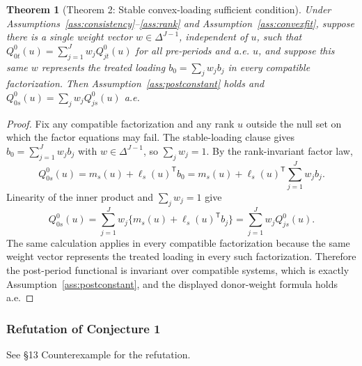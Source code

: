 \documentclass[11pt]{article}
\newcommand{\transpose}{\mathsf{T}}
\theoremstyle{definition}
\theoremstyle{plain}
\newtheorem{theorem}{Theorem}
\theoremstyle{remark}
\begin{document}
\begin{theorem}[Theorem 2: Stable convex-loading sufficient condition]\label{thm:convex-sufficient}
Under Assumptions~\ref{ass:consistency}--\ref{ass:rank} and Assumption~\ref{ass:convexfit}, suppose there is a single weight vector \(w\in\Delta^{J-1}\), independent of \(u\), such that \(Q^0_{0t}(u)=\sum_{j=1}^J w_jQ^0_{jt}(u)\) for all pre-periods and a.e. \(u\), and suppose this same \(w\) represents the treated loading \(b_0=\sum_j w_jb_j\) in every compatible factorization.  Then Assumption~\ref{ass:postconstant} holds and \(Q^0_{0s}(u)=\sum_j w_jQ^0_{js}(u)\) a.e.
\end{theorem}
\begin{proof}
Fix any compatible factorization and any rank \(u\) outside the null set on which the factor equations may fail.  The stable-loading clause gives \(b_0=\sum_{j=1}^J w_jb_j\) with \(w\in\Delta^{J-1}\), so \(\sum_jw_j=1\).  By the rank-invariant factor law,
\[
Q^0_{0s}(u)=m_s(u)+\ell_s(u)^\transpose b_0
=m_s(u)+\ell_s(u)^\transpose\sum_{j=1}^Jw_jb_j.
\]
Linearity of the inner product and \(\sum_jw_j=1\) give
\[
Q^0_{0s}(u)=\sum_{j=1}^Jw_j\{m_s(u)+\ell_s(u)^\transpose b_j\}
=\sum_{j=1}^Jw_jQ^0_{js}(u).
\]
The same calculation applies in every compatible factorization because the same weight vector represents the treated loading in every such factorization.  Therefore the post-period functional is invariant over compatible systems, which is exactly Assumption~\ref{ass:postconstant}, and the displayed donor-weight formula holds a.e.
\end{proof}

\subsubsection*{Refutation of Conjecture 1}
See \S13 Counterexample for the refutation.
\end{document}
